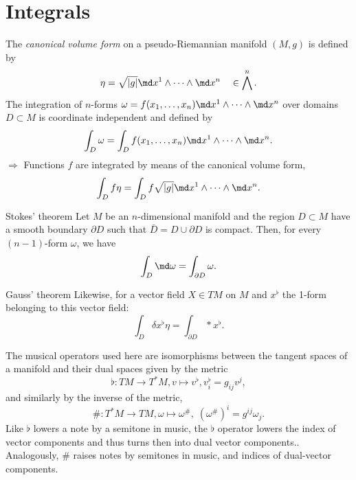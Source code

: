 \section{Integrals}
The \emph{canonical volume form} on a pseudo-Riemannian manifold $(M,g)$ is defined by
\begin{equation}
	\eta = \sqrt{|g|} \md x^1 \wedge \dots \wedge \md x^n \quad \in \bigwedge^n.
\end{equation}
The integration of $n$-forms $\omega=f(x_1,\dots,x_n) \md x^1 \wedge \dots \wedge \md x^n$ over domains $D\subset M$ is coordinate independent and defined by
\begin{equation}
	\int_D \omega = \int_D f(x_1, \dots, x_n) \md x^1 \wedge \dots \wedge \md x^n.
\end{equation}
$\Rightarrow$ Functions $f$ are integrated by means of the canonical volume form,
\begin{equation}
	\int_D f \eta =\int_D f \sqrt{|g|} \md x^1 \wedge \dots \wedge \md x^n.
\end{equation}
\begin{mybox}{Stokes' theorem}
	Let $M$ be an $n$-dimensional manifold and the region $D\subset M$ have a smooth boundary $\partial D$ such that $\bar{D} = D \cup \partial D$ is compact. Then, for every $(n-1)$-form $\omega$, we have 
	\begin{equation}
		\int_D \md \omega = \int_{\partial D} \omega.
	\end{equation}

\end{mybox}

\begin{mybox}{Gauss' theorem}
	Likewise, for a vector field $X\in TM$ on $M$ and $x^{\flat}$ the 1-form belonging to this vector field:
	\begin{equation}
	\int_D \delta x^{\flat} \eta = \int_{\partial D} *x^{\flat}.
	\end{equation}
\end{mybox}

The musical operators used here are isomorphisms between the tangent spaces of a manifold and their dual spaces given by the metric
\begin{equation}
	\flat : TM \rightarrow T^*M, v \mapsto v^{\flat}, v^{\flat}_i =g_{ij} v^j,
\end{equation}
and similarly by the inverse of the metric,
\begin{equation}
	\#:T^*M \rightarrow TM, \omega \mapsto \omega^{\#}, \; (\omega^{\#})^i = g^{ij} \omega_j.
\end{equation}
Like $\flat$ lowers a note by a semitone in music, the $\flat$ operator lowers the index of vector components and thus turns then into dual vector components.. Analogously, $\#$ raises notes by semitones in music, and indices of dual-vector components.




